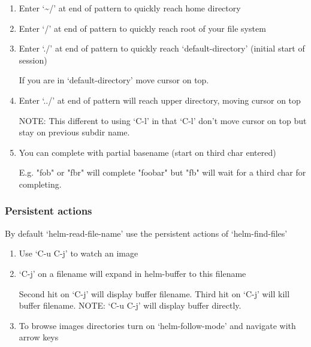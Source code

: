 \documentclass[11pt]{article}
\begin{document}
\begin{enumerate}
\item Enter ‘\textasciitilde{}/’ at end of pattern to quickly reach home directory
\label{sec:org699f436}

\item Enter ‘/’ at end of pattern to quickly reach root of your file system
\label{sec:orgb24c6c9}

\item Enter ‘./’ at end of pattern to quickly reach ‘default-directory’ (initial start of session)
\label{sec:org8e6c461}

If you are in ‘default-directory’ move cursor on top.

\item Enter ‘../’ at end of pattern will reach upper directory, moving cursor on top
\label{sec:org9c091fe}

NOTE: This different to using ‘C-l’ in that ‘C-l’ don’t move cursor on top but stay on previous
subdir name.

\item You can complete with partial basename (start on third char entered)
\label{sec:org34db79f}

E.g. "fob" or "fbr" will complete "foobar"
but "fb" will wait for a third char for completing.
\end{enumerate}

\subsubsection{Persistent actions}
\label{sec:orgba91fcf}

By default ‘helm-read-file-name’ use the persistent actions of ‘helm-find-files’

\begin{enumerate}
\item Use ‘C-u C-j’ to watch an image
\label{sec:orgc9c865b}

\item ‘C-j’ on a filename will expand in helm-buffer to this filename
\label{sec:orgc4129bd}

Second hit on ‘C-j’ will display buffer filename.
Third hit on ‘C-j’ will kill buffer filename.
NOTE: ‘C-u C-j’ will display buffer directly.

\item To browse images directories turn on ‘helm-follow-mode’ and navigate with arrow keys
\label{sec:org1eb0936}
\end{enumerate}
\end{document}
